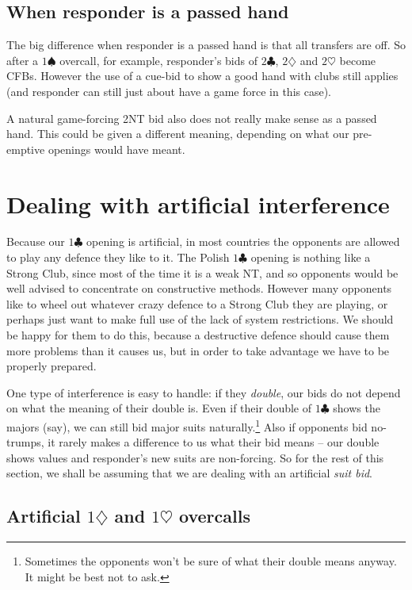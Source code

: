 \documentclass{article}
\newcommand{\sz}{\spadesuit}
\newcommand{\hz}{\heartsuit}
\newcommand{\dz}{\diamondsuit}
\newcommand{\cz}{\clubsuit}
\begin{document}
\subsection{When responder is a passed hand}
The big difference when responder is a passed hand is that all transfers are off. So after a $1\sz$ overcall, for example, responder's bids of $2\cz$, $2\dz$ and $2\hz$ become CFBs. However the use of a cue-bid to show a good hand with clubs still applies (and responder can still just about have a game force in this case).

A natural game-forcing 2NT bid also does not really make sense as a passed hand. This could be given a different meaning, depending on what our pre-emptive openings would have meant.

\newpage
\section{Dealing with artificial interference}

Because our $1\cz$ opening is artificial, in most countries the opponents are allowed to play any defence they like to it. The Polish $1\cz$ opening is nothing like a Strong Club, since most of the time it is a weak NT, and so opponents would be well advised to concentrate on constructive methods. However many opponents like to wheel out whatever crazy defence to a Strong Club they are playing, or perhaps just want to make full use of the lack of system restrictions. We should be happy for them to do this, because a destructive defence should cause them more problems than it causes us, but in order to take advantage we have to be properly prepared.

One type of interference is easy to handle: if they \emph{double}, our bids do not depend on what the meaning of their double is. Even if their double of $1\cz$ shows the majors (say), we can still bid major suits naturally.\footnote{Sometimes the opponents won't be sure of what their double means anyway. It might be best not to ask.} Also if opponents bid no-trumps, it rarely makes a difference to us what their bid means -- our double shows values and responder's new suits are non-forcing. So for the rest of this section, we shall be assuming that we are dealing with an artificial \emph{suit bid}.

\subsection{Artificial $1\dz$ and $1\hz$ overcalls}
\end{document}
